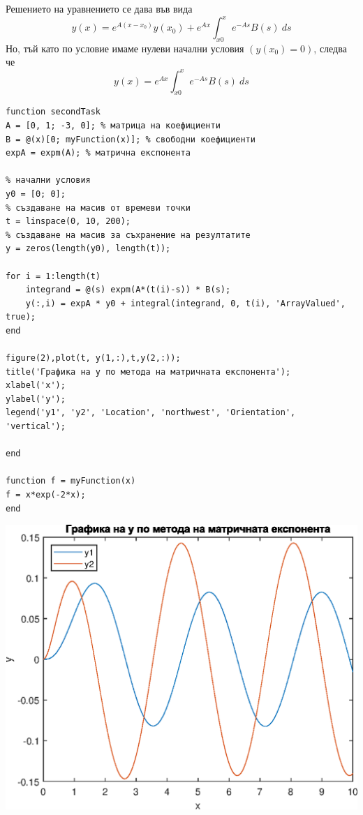 \documentclass[a4paper,fleqn,12pt]{article}
\begin{document}
Решението на уравнението се дава във вида
\begin{equation*}
	y(x)=e^{A(x-x_0)} y(x_0) + e^{Ax} \int_{x0} ^{x} e^{-As} B(s) \ ds
\end{equation*}
Но, тъй като по условие имаме нулеви начални условия $(y(x_0)=0)$, следва че 
\begin{equation*}
	y(x)=e^{Ax} \int_{x0} ^{x} e^{-As} B(s) \ ds
\end{equation*}
\newpage
\begin{verbatim}
function secondTask
A = [0, 1; -3, 0]; % матрица на коефициенти
B = @(x)[0; myFunction(x)]; % свободни коефициенти
expA = expm(A); % матрична експонента

% начални условия
y0 = [0; 0];
% създаване на масив от времеви точки
t = linspace(0, 10, 200);
% създаване на масив за съхранение на резултатите
y = zeros(length(y0), length(t));

for i = 1:length(t)
    integrand = @(s) expm(A*(t(i)-s)) * B(s);
    y(:,i) = expA * y0 + integral(integrand, 0, t(i), 'ArrayValued', true);
end

figure(2),plot(t, y(1,:),t,y(2,:));
title('Графика на y по метода на матричната експонента');
xlabel('x');
ylabel('y');
legend('y1', 'y2', 'Location', 'northwest', 'Orientation', 'vertical');

end

function f = myFunction(x)
f = x*exp(-2*x);
end
\end{verbatim}

\includegraphics{secondTask_01.eps}
\end{document}
